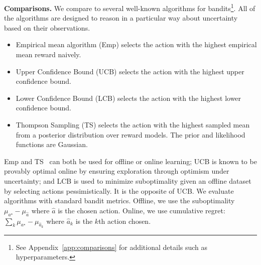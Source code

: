 \textbf{Comparisons.}
We compare to several well-known algorithms for bandits\footnote{See Appendix~\ref{app:comparisons} for additional details such as hyperparameters.}. All of the algorithms are designed to reason in a particular way about uncertainty based on their observations.
\begin{itemize}[leftmargin=1em,noitemsep]
\item Empirical mean algorithm (Emp) selects the action with the highest empirical mean reward naively.
\item Upper Confidence Bound (UCB) selects the action with the highest  upper confidence bound. 
\item Lower Confidence Bound (LCB) selects the action with the highest lower confidence bound. 
\item Thompson Sampling (TS) selects the action with the highest sampled mean from a posterior distribution over reward models. The prior and likelihood functions are Gaussian.
\end{itemize}
Emp and TS~\citep{russo2018tutorial,thompson1933likelihood} can both be used for offline or online learning; UCB \citep{auer2002finite} is known to be provably optimal online by ensuring exploration through optimism under uncertainty; and LCB \citep{xiao2021optimality,jin2021pessimism} is  used to minimize suboptimality given an offline dataset by selecting actions pessimistically. It is the opposite of UCB. We evaluate algorithms with standard bandit metrics. Offline, we use the suboptimality $\mu_{a^\star} - \mu_{\hat a}$ where $\hat a$ is the chosen action. Online, we use  cumulative regret: $\sum_{k} \mu_{a^\star} - \mu_{\hat a_k}$ where $\hat a_k$ is the $k$th action chosen.

